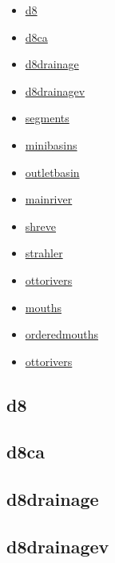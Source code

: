\documentclass[
]{book}
\providecommand{\tightlist}{%
  \setlength{\itemsep}{0pt}\setlength{\parskip}{0pt}}
\theoremstyle{definition}
\theoremstyle{definition}
\theoremstyle{definition}
\theoremstyle{definition}
\theoremstyle{remark}
\begin{document}
\begin{itemize}
\tightlist
\item
  \hyperref[d8]{d8}\\
\item
  \hyperref[d8ca]{d8ca}\\
\item
  \hyperref[d8drainage]{d8drainage}\\
\item
  \hyperref[d8drainagev]{d8drainagev}\\
\item
  \hyperref[segments]{segments}\\
\item
  \hyperref[minibasins]{minibasins}\\
\item
  \hyperref[outletbasin]{outletbasin}\\
\item
  \hyperref[mainriver]{mainriver}\\
\item
  \hyperref[shreve]{shreve}\\
\item
  \hyperref[strahler]{strahler}\\
\item
  \hyperref[ottorivers]{ottorivers}\\
\item
  \hyperref[mouths]{mouths}\\
\item
  \hyperref[orderedmouths]{orderedmouths}
\item
  \hyperref[ottorivers]{ottorivers}
\end{itemize}

\subsection{d8}\label{d8}

\subsection{d8ca}\label{d8ca}

\subsection{d8drainage}\label{d8drainage}

\subsection{d8drainagev}\label{d8drainagev}
\end{document}
